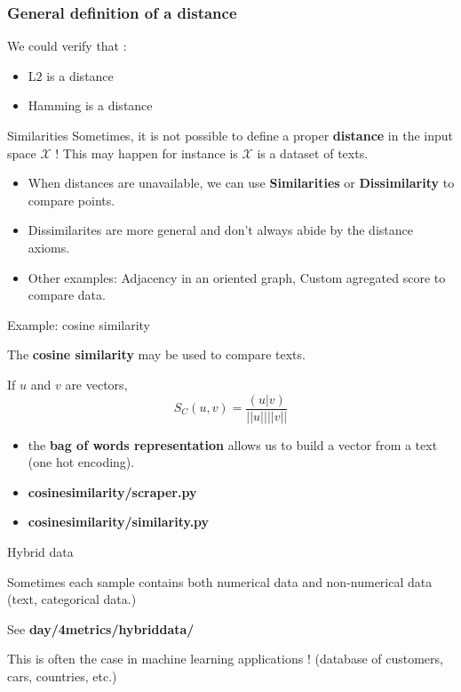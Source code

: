 \documentclass[usenames,dvipsnames,french]{beamer}
\begin{document}
\begin{frame}
    \frametitle{General definition of a distance}
    We could verify that : 
    \begin{itemize}
	\item L$2$ is a distance
	\item Hamming is a distance
    \end{itemize}
\end{frame}

\begin{frame}{Similarities}
    Sometimes, it is not possible to define a proper \textbf{distance} in the input space $ \mathcal{X}$ ! This may happen for instance is $ \mathcal{X}$ is a dataset of texts.
    \begin{itemize}
	\item When distances are unavailable, we can use \textbf{{Similarities}} or \textbf{{Dissimilarity}} to compare points.
	\item Dissimilarites are more general and don't always abide by the
	    distance axioms.
	\item Other examples: Adjacency in an oriented graph, Custom agregated score to compare data. 
    \end{itemize}
\end{frame}

\begin{frame}{Example: cosine similarity}

    The \textbf{{cosine similarity}} may be used to compare texts.

    If $u$ and $v$ are vectors,
    \begin{equation}
	S_C(u, v) = \frac{(u|v)}{||u|| ||v||} 
    \end{equation}

    \begin{itemize}
	\item the \textbf{{bag of words representation}} allows us to build a vector from a text (one hot encoding).
	\item \textbf{{cosine\textunderscore similarity/scraper.py}} 
	\item \textbf{{cosine\textunderscore similarity/similarity.py}} 
    \end{itemize}
\end{frame}


\begin{frame}{Hybrid data}

    Sometimes each sample contains both numerical data and non-numerical data (text, categorical data.)

    See \textbf{day/4\textunderscore metrics/hybrid\textunderscore data/}

    This is often the case in machine learning applications ! (database of customers, cars, countries, etc.)

\end{frame}
\end{document}
